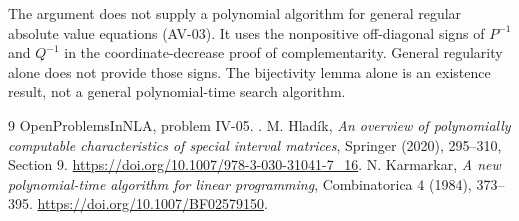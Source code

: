 The argument does not supply a polynomial algorithm for general regular absolute value equations (AV-03). It uses the nonpositive off-diagonal signs of $P^{-1}$ and $Q^{-1}$ in the coordinate-decrease proof of complementarity. General regularity alone does not provide those signs. The bijectivity lemma alone is an existence result, not a general polynomial-time search algorithm.
\begin{thebibliography}{9}
 OpenProblemsInNLA, problem IV-05. .
 M. Hlad\'ik, \emph{An overview of polynomially computable characteristics of special interval matrices}, Springer (2020), 295--310, Section 9. \url{https://doi.org/10.1007/978-3-030-31041-7_16}.
 N. Karmarkar, \emph{A new polynomial-time algorithm for linear programming}, Combinatorica 4 (1984), 373--395. \url{https://doi.org/10.1007/BF02579150}.
\end{thebibliography}


